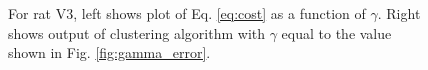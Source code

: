 \documentclass[superscriptaddress, twocolumn, prl]{revtex4}
\begin{document}
\begin{figure}
\centering
{}
\caption{For rat V3, left shows plot of Eq. \ref{eq:cost} as a function of $\gamma$. Right shows output of clustering algorithm with $\gamma$ equal to the value shown in Fig. \ref{fig:gamma_error}.}
\end{figure}
\end{document}
